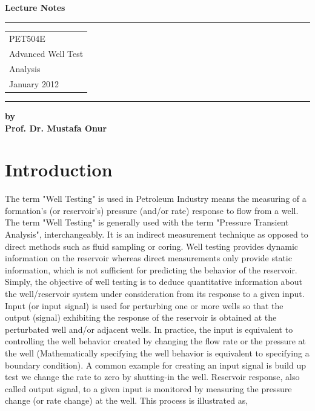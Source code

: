 \documentclass{llncs}
\numberwithin{equation}{section}
\numberwithin{figure}{section}
\numberwithin{table}{section}
\begin{document}
    \thispagestyle{empty}
    \begin{flushleft}
        \LARGE\bfseries Lecture Notes\\[1cm]
    \end{flushleft}
    \rule{\textwidth}{1pt}
    \vspace{2pt}
    \begin{flushright}
        \Huge
            \begin{tabular}{@{}l}
                PET504E \\
                Advanced Well Test \\
                Analysis\\[6pt]
                {\Large January 2012}
            \end{tabular}
        \end{flushright}
    \rule{\textwidth}{1pt}

    \begin{flushleft}
        \LARGE\bfseries by\\ Prof. Dr. Mustafa Onur \\[2cm]

    \end{flushleft}
    \vfill

    \section{Introduction}
%
    The term "Well Testing"  is used in Petroleum Industry means the measuring of a formation's
    (or reservoir's) pressure (and/or rate) response to flow from a well. The term "Well Testing"
    is generally used with the term "Pressure Transient Analysis", interchangeably. It is an indirect
    measurement technique as opposed to direct methods such as fluid sampling or coring. Well testing
    provides dynamic information on the reservoir whereas direct measurements only provide static
    information, which is not sufficient for predicting the behavior of the reservoir.\\

    Simply, the objective of well testing is to deduce quantitative information about the well/reservoir system
    under consideration from its response to a given input. Input (or input signal) is used for perturbing one or more
    wells so that the output (signal) exhibiting the response of the reservoir is obtained at the perturbated well and/or
    adjacent wells. In practice, the input is equivalent to controlling the well behavior  created by changing
    the flow rate or the pressure at the well (Mathematically specifying the well behavior is equivalent to specifying
    a boundary condition). A common example for creating an input signal is  build up test
     we change the rate to zero by shutting-in the well. Reservoir response,
     also called output signal, to a given input is monitored by measuring the
    pressure change (or rate change) at the   well. This process is illustrated as,
\end{document}

